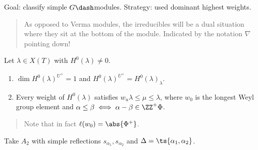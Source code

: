 \begin{center}
\end{center}

Goal: classify simple \(G\dash\)modules. Strategy: used dominant highest
weights.

\begin{quote}
As opposed to Verma modules, the irreducibles will be a dual situation
where they sit at the bottom of the module. Indicated by the notation
\(\nabla\) pointing down!
\end{quote}

\begin{proposition}[?]

Let \(\lambda \in X(T)\) with \(H^0(\lambda) \neq 0\).

\begin{enumerate}
\def\labelenumi{\arabic{enumi}.}
\tightlist
\item
  \(\dim H^0(\lambda)^{U^+} = 1\) and
  \(H^0(\lambda)^{U^+} = H^0(\lambda)_\lambda\).
\item
  Every weight of \(H^0(\lambda)\) satisfies
  \(w_u \lambda \leq \mu \leq \lambda\), where \(w_0\) is the longest
  Weyl group element and
  \(\alpha\leq \beta \iff \alpha-\beta \in \ZZ^{+}\Phi\).
\end{enumerate}

\begin{quote}
Note that in fact \(\ell(w_0) = \abs{\Phi^+}\).
\end{quote}

\end{proposition}

\begin{example}

Take \(A_2\) with simple reflections \(s_{\alpha_1}, s_{\alpha_2}\) and
\(\Delta = \ts{\alpha_1, \alpha_2}\).

\begin{center}
\end{center}

\end{example}

